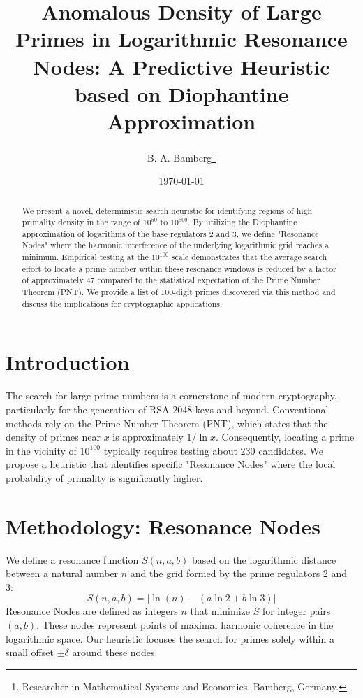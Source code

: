 \documentclass[11pt,a4paper]{article}
\title{\textbf{Anomalous Density of Large Primes in Logarithmic Resonance Nodes: A Predictive Heuristic based on Diophantine Approximation}}
\author{B. A. Bamberg\footnote{Researcher in Mathematical Systems and Economics, Bamberg, Germany.}}
\date{\today}
\begin{document}
	
	\maketitle
	
	\begin{abstract}
		We present a novel, deterministic search heuristic for identifying regions of high primality density in the range of $10^{50}$ to $10^{500}$. By utilizing the Diophantine approximation of logarithms of the base regulators 2 and 3, we define "Resonance Nodes" where the harmonic interference of the underlying logarithmic grid reaches a minimum. Empirical testing at the $10^{100}$ scale demonstrates that the average search effort to locate a prime number within these resonance windows is reduced by a factor of approximately 47 compared to the statistical expectation of the Prime Number Theorem (PNT). We provide a list of 100-digit primes discovered via this method and discuss the implications for cryptographic applications.
	\end{abstract}
	
	\section{Introduction}
	The search for large prime numbers is a cornerstone of modern cryptography, particularly for the generation of RSA-2048 keys and beyond. Conventional methods rely on the Prime Number Theorem (PNT), which states that the density of primes near $x$ is approximately $1/\ln x$. Consequently, locating a prime in the vicinity of $10^{100}$ typically requires testing about 230 candidates. We propose a heuristic that identifies specific "Resonance Nodes" where the local probability of primality is significantly higher.
	
	\section{Methodology: Resonance Nodes}
	We define a resonance function $S(n, a, b)$ based on the logarithmic distance between a natural number $n$ and the grid formed by the prime regulators 2 and 3:
	\begin{equation}
		S(n, a, b) = \left| \ln(n) - (a \ln 2 + b \ln 3) \right|
	\end{equation}
	Resonance Nodes are defined as integers $n$ that minimize $S$ for integer pairs $(a, b)$. These nodes represent points of maximal harmonic coherence in the logarithmic space. Our heuristic focuses the search for primes solely within a small offset $\pm \delta$ around these nodes.
	
\end{document}
